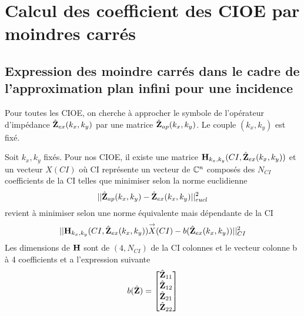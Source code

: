 \section{Calcul des coefficient des CIOE par moindres carrés}


\subsection{Expression des moindre carrés dans le cadre de l'approximation plan infini pour une incidence}
  Pour toutes les CIOE, on cherche à approcher le symbole de l'opérateur d'impédance \(\hat{\mathbf{Z}}_{ex}(k_x,k_y)\) par une matrice \(\hat{\mathbf{Z}}_{ap}(k_x,k_y)\). Le couple \((k_x,k_y)\) est fixé.

  \begin{prop}
    Soit \(k_x,k_y\) fixés.
    Pour nos CIOE, il existe une matrice \(\mathbf{H}_{k_x,k_y}(CI,\hat{\mathbf{Z}}_{ex}(k_x,k_y))\) et un vecteur \(X(CI)\) où CI représente un vecteur de \(\mathbb C^n\) composés des \(N_{CI}\) coefficients de la CI telles que minimiser selon la norme euclidienne
    \[
      ||\hat{\mathbf{Z}}_{ap}(k_x,k_y)-\hat{\mathbf{Z}}_{ex}(k_x,k_y)||^2_{eucl}
    \] 
    revient à minimiser selon une norme équivalente mais dépendante de la CI
    \[ 
      || \mathbf{H}_{k_x,k_y}(CI,\hat{\mathbf{Z}}_{ex}(k_x,k_y)) {\overset{\rightarrow}{X}}(CI) - b(\hat{\mathbf{Z}}_{ex}(k_x,k_y)) ||^2_{CI}
    \]
    Les dimensions de \(\mathbf{H}\) sont de \( (4,N_{CI}) \) de la CI colonnes et le vecteur colonne b à 4 coefficients et a l'expression suivante
    \begin{align}
      b(\hat{\mathbf{Z}}) = \begin{bmatrix} \hat{\mathbf{Z}}_{11} \\ \hat{\mathbf{Z}}_{12}\\ \hat{\mathbf{Z}}_{21} \\ \hat{\mathbf{Z}}_{22} \end{bmatrix}
    \end{align}
  \end{prop}

